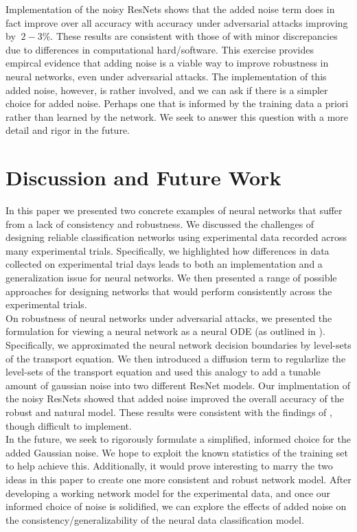 \documentclass[12pt]{article}
\begin{document}
Implementation of the noisy ResNets shows that the added noise term does in fact improve over all accuracy with accuracy under adversarial attacks improving by $~2-3\%$. These results are consistent with those of \cite{res} with minor discrepancies due to differences in computational hard/software. This exercise provides empircal evidence that adding noise is a viable way to improve robustness in neural networks, even under adversarial attacks. The implementation of this added noise, however, is rather involved, and we can ask if there is a simpler choice for added noise. Perhaps one that is informed by the training data a priori rather than learned by the network. We seek to answer this question with a more detail and rigor in the future. \\
\section{Discussion and Future Work}
In this paper we presented two concrete examples of neural networks that suffer from a lack of consistency and robustness. We discussed the challenges of designing reliable classification networks using experimental data recorded across many experimental trials. Specifically, we highlighted how differences in data collected on experimental trial days leads to both an implementation and a generalization issue for neural networks.  We then presented a range of possible approaches for designing networks that would perform consistently across the experimental trials.  \\
On robustness of neural networks under adversarial attacks, we presented the formulation for viewing a neural network as a neural ODE (as outlined in \cite{node,res}). Specifically, we approximated the neural network decision boundaries by level-sets of the transport equation. We then introduced a diffusion term to regularlize the level-sets of the transport equation and used this analogy to add a tunable amount of gaussian noise into two different ResNet models. Our implmentation of the noisy ResNets showed that added noise improved the overall accuracy of the robust and natural model. These results were consistent with the findings of \cite{res}, though difficult to implement. \\
In the future, we seek to rigorously formulate a simplified, informed choice for the added Gaussian noise. We hope to exploit the known statistics of the training set to help achieve this. Additionally, it would prove interesting to marry the two ideas in this paper to create one more consistent and robust network model. After developing a working network model for the experimental data, and once our informed choice of noise is solidified, we can explore the effects of added noise on the consistency/generalizability of the neural data classification model.

\pagebreak
\printbibliography
\end{document}
